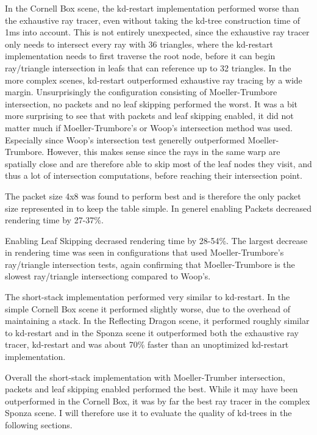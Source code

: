 In the Cornell Box scene, the kd-restart implementation performed worse than the
exhaustive ray tracer, even without taking the kd-tree construction time of 1ms
into account. This is not entirely unexpected, since the exhaustive ray tracer
only needs to intersect every ray with 36 triangles, where the kd-restart
implementation needs to first traverse the root node, before it can begin
ray/triangle intersection in leafs that can reference up to 32 triangles. In the
more complex scenes, kd-restart outperformed exhaustive ray tracing by a wide
margin. Unsurprisingly the configuration consisting of Moeller-Trumbore
intersection, no packets and no leaf skipping performed the worst. It was a bit
more surprising to see that with packets and leaf skipping enabled, it did not
matter much if Moeller-Trumbore's or Woop's intersection method was
used. Especially since Woop's intersection test generelly outperformed
Moeller-Trumbore. However, this makes sense since the rays in the same warp are
spatially close and are therefore able to skip most of the leaf nodes they
visit, and thus a lot of intersection computations, before reaching their
intersection point.

The packet size 4x8 was found to perform best and is therefore the only packet
size represented in  to keep the table
simple. In generel enabling Packets decreased rendering time by 27-37\%.

Enabling Leaf Skipping decrased rendering time by 28-54\%. The largest decrease
in rendering time was seen in configurations that used Moeller-Trumbore's
ray/triangle intersection tests, again confirming that Moeller-Trumbore is the
slowest ray/triangle intersectiong compared to Woop's.

The short-stack implementation performed very similar to kd-restart. In the
simple Cornell Box scene it performed slightly worse, due to the overhead of
maintaining a stack. In the Reflecting Dragon scene, it performed roughly
similar to kd-restart and in the Sponza scene it outperformed both the
exhaustive ray tracer, kd-restart and was about 70\% faster than an unoptimized
kd-restart implementation.

Overall the short-stack implementation with Moeller-Trumber intersection,
packets and leaf skipping enabled performed the best. While it may have been
outperformed in the Cornell Box, it was by far the best ray tracer in the
complex Sponza scene. I will therefore use it to evaluate the quality of
kd-trees in the following sections.


